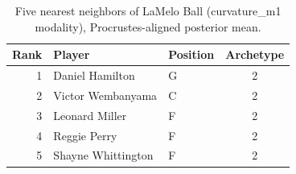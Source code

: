 \begin{table}[htbp]
  \centering\small
  \begin{tabular}{rllc}
    \toprule
    Rank & Player & Position & Archetype \\
    \midrule
    1 & Daniel Hamilton & G & 2 \\
    2 & Victor Wembanyama & C & 2 \\
    3 & Leonard Miller & F & 2 \\
    4 & Reggie Perry & F & 2 \\
    5 & Shayne Whittington & F & 2 \\
    \bottomrule
  \end{tabular}
  \caption{Five nearest neighbors of LaMelo Ball (curvature_m1 modality), Procrustes-aligned posterior mean.}
  \label{tab:LaMelo_Ball_neighbors_curvature_m1}
\end{table}

